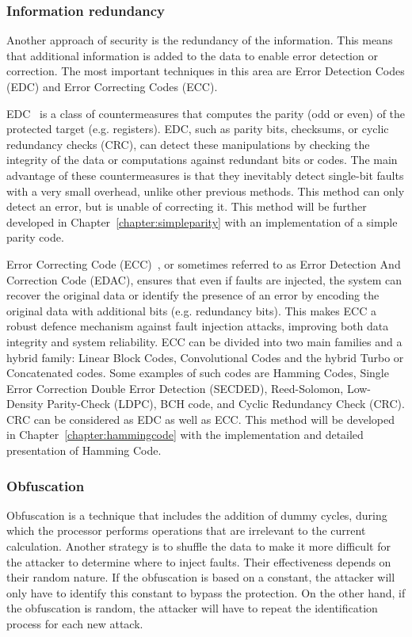 \subsubsection{Information redundancy}
Another approach of security is the redundancy of the information. This means that additional information is added to the data to enable error detection or correction. The most important techniques in this area are Error Detection Codes (EDC) and Error Correcting Codes (ECC).

EDC~\cite{APHBML-16-date,MKBM-14-sta,BBKMP-03-toc} is a class of countermeasures that computes the parity (odd or even) of the protected target (e.g. registers). EDC, such as parity bits, checksums, or cyclic redundancy checks (CRC), can detect these manipulations by checking the integrity of the data or computations against redundant bits or codes. The main advantage of these countermeasures is that they inevitably detect single-bit faults with a very small overhead, unlike other previous methods. This method can only detect an error, but is unable of correcting it. This method will be further developed in Chapter~\ref{chapter:simpleparity} with an implementation of a simple parity code.

Error Correcting Code (ECC)~\cite{PTCVAJ-20-iscas,DGMMNM-20-arcs,CB-06-toc}, or sometimes referred to as Error Detection And Correction Code (EDAC), ensures that even if faults are injected, the system can recover the original data or identify the presence of an error by encoding the original data with additional bits (e.g. redundancy bits). This makes ECC a robust defence mechanism against fault injection attacks, improving both data integrity and system reliability. ECC can be divided into two main families and a hybrid family: Linear Block Codes, Convolutional Codes and the hybrid Turbo or Concatenated codes. Some examples of such codes are Hamming Codes, Single Error Correction Double Error Detection (SECDED), Reed-Solomon, Low-Density Parity-Check (LDPC), BCH code, and Cyclic Redundancy Check (CRC). CRC can be considered as EDC as well as ECC. This method will be developed in Chapter~\ref{chapter:hammingcode} with the implementation and detailed presentation of Hamming Code.

\subsubsection{Obfuscation}
Obfuscation is a technique that includes the addition of dummy cycles, during which the processor performs operations that are irrelevant to the current calculation. Another strategy is to shuffle the data to make it more difficult for the attacker to determine where to inject faults. Their effectiveness depends on their random nature. If the obfuscation is based on a constant, the attacker will only have to identify this constant to bypass the protection. On the other hand, if the obfuscation is random, the attacker will have to repeat the identification process for each new attack.

